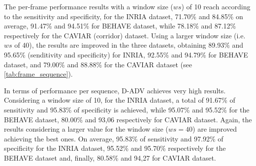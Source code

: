The per-frame performance results with a window size ($ws$) of 10 reach according to the sensitivity and specificity, for the INRIA dataset, 71.70\% and 84.85\% on average, 91.47\% and 94.51\% for BEHAVE dataset, while 78.18\% and 87.12\% respectively for the CAVIAR (corridor) dataset. Using a larger window size (i.e. $ws$ of 40), the results are improved in the three datasets, obtaining 89.93\% and 95.65\% (senditivity and specificity) for INRIA, 92.55\% and 94.79\%  for BEHAVE dataset, and 79.00\% and 88.88\% for the CAVIAR dataset (see \ref{tab:frame_sequence}). 

In terms of performance per sequence, D-ADV achieves very high results. Considering a window size of 10, for the INRIA dataset, a total of 91.67\% of sensitivity and 95.83\% of specificity is achieved, while 95.07\% and 95.52\%  for the BEHAVE dataset, 80.00\% and 93,06 respectively for CAVIAR dataset. Again, the results considering a larger value for the window size ($ws=40$) are improved achieving the best ones. On average, 95.83\% of sensitivity and 97.92\% of specificity for the INRIA dataset, 95.52\% and 95.70\% respectively for the BEHAVE dataset and, finally, 80.58\% and 94,27 for CAVIAR dataset.


